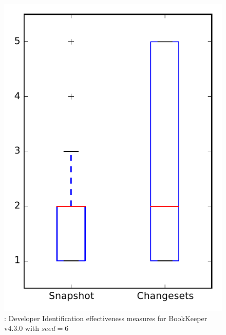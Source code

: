 
\begin{figure}
\centering
\includegraphics[height=0.4\textheight]{figures/dit_seed/rq1_bookkeeper_6}
\caption{\rtwo: Developer Identification effectiveness measures for BookKeeper v4.3.0 with $seed=6$}
\label{fig:dit_seed:rq1:bookkeeper}
\end{figure}
